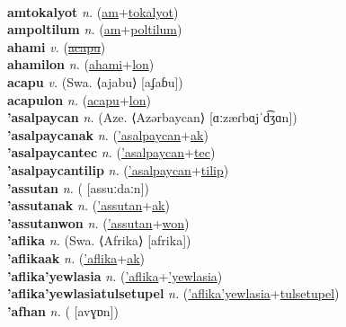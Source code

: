  \label{amkwelwelsomaluat} \\
\textbf{amtokalyot} \textit{n.} (\hyperref[am]{am}+\hyperref[tokalyot]{tokalyot})
 \label{amtokalyot} \\
\textbf{ampoltilum} \textit{n.} (\hyperref[am]{am}+\hyperref[poltilum]{poltilum})
 \label{ampoltilum} \\
\textbf{ahami} \textit{v.} (\hyperref[acapu]{\sout{acapu}})
 \label{ahami} \\
\textbf{ahamilon} \textit{n.} (\hyperref[ahami]{ahami}+\hyperref[lon]{lon})
 \label{ahamilon} \\
\textbf{acapu} \textit{v.} (Swa. ⟨ajabu⟩ [aʄaɓu])
 \label{acapu} \\
\textbf{acapulon} \textit{n.} (\hyperref[acapu]{acapu}+\hyperref[lon]{lon})
 \label{acapulon} \\
\textbf{'asalpaycan} \textit{n.} (Aze. ⟨Azərbaycan⟩ [ɑːzæɾbɑjˈd͡ʒɑn])
 \label{'asalpaycan} \\
\textbf{'asalpaycanak} \textit{n.} (\hyperref['asalpaycan]{'asalpaycan}+\hyperref[ak]{ak})
 \label{'asalpaycanak} \\
\textbf{'asalpaycantec} \textit{n.} (\hyperref['asalpaycan]{'asalpaycan}+\hyperref[tec]{tec})
 \label{'asalpaycantec} \\
\textbf{'asalpaycantilip} \textit{n.} (\hyperref['asalpaycan]{'asalpaycan}+\hyperref[tilip]{tilip})
 \label{'asalpaycantilip} \\
\textbf{'assutan} \textit{n.} ( [assuːdaːn])
 \label{'assutan} \\
\textbf{'assutanak} \textit{n.} (\hyperref['assutan]{'assutan}+\hyperref[ak]{ak})
 \label{'assutanak} \\
\textbf{'assutanwon} \textit{n.} (\hyperref['assutan]{'assutan}+\hyperref[won]{won})
 \label{'assutanwon} \\
\textbf{'aflika} \textit{n.} (Swa. ⟨Afrika⟩ [afrika])
 \label{'aflika} \\
\textbf{'aflikaak} \textit{n.} (\hyperref['aflika]{'aflika}+\hyperref[ak]{ak})
 \label{'aflikaak} \\
\textbf{'aflika'yewlasia} \textit{n.} (\hyperref['aflika]{'aflika}+\hyperref['yewlasia]{'yewlasia})
 \label{'aflika'yewlasia} \\
\textbf{'aflika'yewlasiatulsetupel} \textit{n.} (\hyperref['aflika'yewlasia]{'aflika'yewlasia}+\hyperref[tulsetupel]{tulsetupel})
 \label{'aflika'yewlasiatulsetupel} \\
\textbf{'afhan} \textit{n.} ( [avɣɒn])
 \label{'afhan} \\
